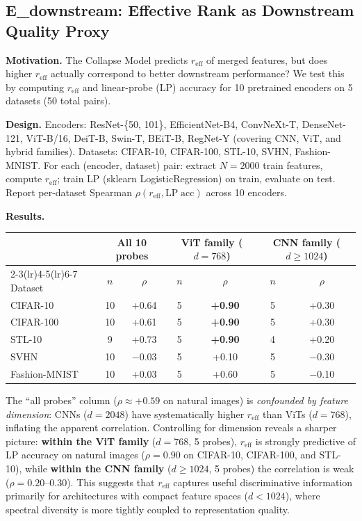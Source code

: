 \documentclass{article}
\newcommand{\reff}{\ensuremath{r_{\mathrm{eff}}}\xspace}
\begin{document}
\subsection{E\_downstream: Effective Rank as Downstream Quality Proxy}
\label{sec:edownstream}

\textbf{Motivation.}
The Collapse Model predicts $\reff$ of merged features, but does higher $\reff$
actually correspond to better downstream performance?
We test this by computing $\reff$ and linear-probe (LP) accuracy
for 10 pretrained encoders on 5 datasets (50 total pairs).

\textbf{Design.}
Encoders: ResNet-\{50, 101\}, EfficientNet-B4, ConvNeXt-T, DenseNet-121,
ViT-B/16, DeiT-B, Swin-T, BEiT-B, RegNet-Y (covering CNN, ViT, and hybrid families).
Datasets: CIFAR-10, CIFAR-100, STL-10, SVHN, Fashion-MNIST.
For each (encoder, dataset) pair: extract $N{=}2000$ train features,
compute $\reff$; train LP (sklearn LogisticRegression) on train, evaluate on test.
Report per-dataset Spearman $\rho(\reff, \mathrm{LP\;acc})$ across 10 encoders.

\textbf{Results.}

\begin{center}
\setlength{\tabcolsep}{4pt}
\begin{tabular}{lcccccc}
\toprule
& \multicolumn{2}{c}{All 10 probes} & \multicolumn{2}{c}{ViT family ($d{=}768$)} & \multicolumn{2}{c}{CNN family ($d{\geq}1024$)} \\
\cmidrule(lr){2-3}\cmidrule(lr){4-5}\cmidrule(lr){6-7}
Dataset & $n$ & $\rho$ & $n$ & $\rho$ & $n$ & $\rho$ \\
\midrule
CIFAR-10  & 10 & +0.64 & 5 & \textbf{+0.90} & 5 & +0.30 \\
CIFAR-100 & 10 & +0.61 & 5 & \textbf{+0.90} & 5 & +0.30 \\
STL-10    &  9 & +0.73 & 5 & \textbf{+0.90} & 4 & +0.20 \\
SVHN      & 10 & $-$0.03 & 5 & +0.10 & 5 & $-$0.30 \\
Fashion-MNIST & 10 & +0.03 & 5 & +0.60 & 5 & $-$0.10 \\
\bottomrule
\end{tabular}
\end{center}

The ``all probes'' column ($\rho\approx+0.59$ on natural images)
is \emph{confounded by feature dimension}: CNNs ($d{=}2048$) have
systematically higher $\reff$ than ViTs ($d{=}768$), inflating the
apparent correlation.
Controlling for dimension reveals a sharper picture:
\textbf{within the ViT family} ($d{=}768$, 5 probes),
$\reff$ is strongly predictive of LP accuracy on natural images
($\rho{=}0.90$ on CIFAR-10, CIFAR-100, and STL-10),
while \textbf{within the CNN family} ($d{\geq}1024$, 5 probes)
the correlation is weak ($\rho{=}0.20$--$0.30$).
This suggests that $\reff$ captures useful discriminative information
primarily for architectures with compact feature spaces ($d{<}1024$),
where spectral diversity is more tightly coupled to representation quality.
\end{document}
